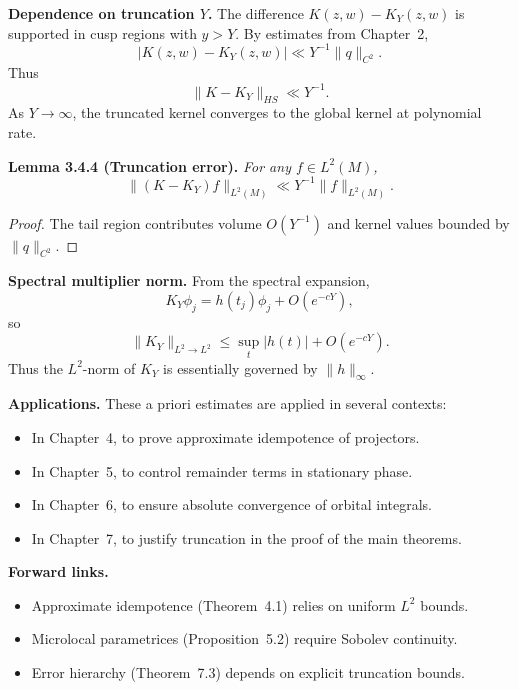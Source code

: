\medskip

\noindent\textbf{Dependence on truncation $Y$.}
The difference $K(z,w)-K_{Y}(z,w)$ is supported in cusp regions with $y>Y$.
By estimates from Chapter~2,
\[
  |K(z,w)-K_{Y}(z,w)| \ll Y^{-1}\|q\|_{C^{2}}.
\]
Thus
\[
  \|K-K_{Y}\|_{HS} \ll Y^{-1}.
\]
As $Y\to\infty$,
the truncated kernel converges to the global kernel at polynomial rate.

\medskip

\noindent\textbf{Lemma 3.4.4 (Truncation error).}
\emph{For any $f\in L^{2}(M)$,
\[
  \|(K-K_{Y})f\|_{L^{2}(M)} \ll Y^{-1}\|f\|_{L^{2}(M)}.
\]}

\begin{proof}
The tail region contributes volume $O(Y^{-1})$
and kernel values bounded by $\|q\|_{C^{2}}$.
\end{proof}

\medskip

\noindent\textbf{Spectral multiplier norm.}
From the spectral expansion,
\[
  K_{Y}\phi_{j} = h(t_{j})\phi_{j} + O(e^{-cY}),
\]
so
\[
  \|K_{Y}\|_{L^{2}\to L^{2}} \le \sup_{t}|h(t)| + O(e^{-cY}).
\]
Thus the $L^{2}$-norm of $K_{Y}$ is essentially governed by $\|h\|_{\infty}$.

\medskip

\noindent\textbf{Applications.}
These a priori estimates are applied in several contexts:
\begin{itemize}
  \item In Chapter~4, to prove approximate idempotence of projectors.
  \item In Chapter~5, to control remainder terms in stationary phase.
  \item In Chapter~6, to ensure absolute convergence of orbital integrals.
  \item In Chapter~7, to justify truncation in the proof of the main theorems.
\end{itemize}

\medskip

\noindent\textbf{Forward links.}
\begin{itemize}
  \item Approximate idempotence (Theorem~4.1) relies on uniform $L^{2}$ bounds.
  \item Microlocal parametrices (Proposition~5.2) require Sobolev continuity.
  \item Error hierarchy (Theorem~7.3) depends on explicit truncation bounds.
\end{itemize}

